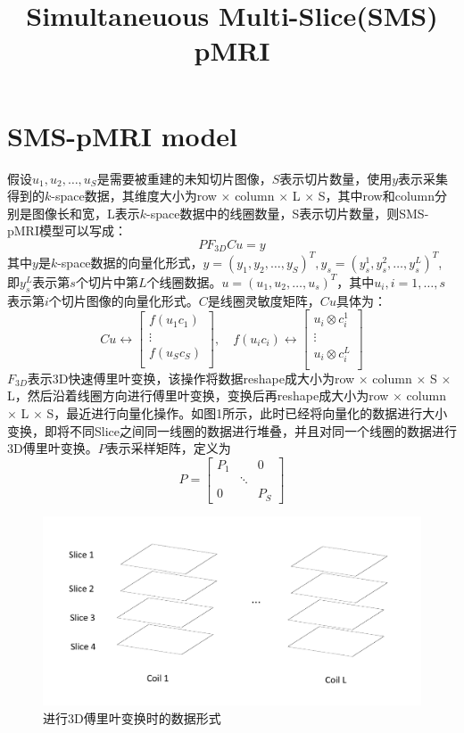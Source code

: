 \documentclass[lang=cn,11pt,a4paper,cite=numbers]{elegantpaper}
\title{Simultaneuous Multi-Slice(SMS) pMRI}
\date{\zhtoday}
\begin{document}
\maketitle

\section{SMS-pMRI model}
\par 假设$u_1, u_2,\dots, u_S$是需要被重建的未知切片图像，$S$表示切片数量，使用$y$表示采集得到的$k$-space数据，其维度大小为row $\times$ column $\times$ L $\times$ S，其中row和column分别是图像长和宽，L表示$k$-space数据中的线圈数量，S表示切片数量，则SMS-pMRI模型可以写成：
\begin{equation}
	PF_{3D}Cu = y
\end{equation}
其中$y$是$k$-space数据的向量化形式，$y=(y_1,y_2,\dots,y_S)^T,y_s=(y_s^{1},y_s^{2}, \dots,y_s^{L})^T$, 即$y_s^{L}$表示第$s$个切片中第$L$个线圈数据。$u=(u_1,u_2,\dots, u_s)^T$，其中$u_i,i=1,\dots,s$表示第$i$个切片图像的向量化形式。$C$是线圈灵敏度矩阵，$Cu$具体为：
\begin{equation}
	Cu \leftrightarrow
	\begin{bmatrix}
		f(u_1c_1) \\
		\vdots \\
		f(u_Sc_S)\\
	\end{bmatrix},
	\quad
	f(u_i c_i) \leftrightarrow
	\begin{bmatrix}
		u_i \otimes c_i^{1} \\
		\vdots \\
		u_i \otimes c_i^{L}\\
	\end{bmatrix}	
\end{equation}
$F_{3D}$表示3D快速傅里叶变换，该操作将数据reshape成大小为row $\times$ column $\times$ S $\times$ L，然后沿着线圈方向进行傅里叶变换，变换后再reshape成大小为row $\times$ column $\times$ L $\times$ S，最近进行向量化操作。如图1所示，此时已经将向量化的数据进行大小变换，即将不同Slice之间同一线圈的数据进行堆叠，并且对同一个线圈的数据进行3D傅里叶变换。$P$表示采样矩阵，定义为
\begin{equation}
	P=
	\begin{bmatrix}
		P_1 & & 0\\
		& \ddots& \\
		0& & P_S
	\end{bmatrix}
\end{equation}
\begin{figure}
	\centering
	\includegraphics[width=0.7\linewidth]{screenshot001}
	\caption{进行3D傅里叶变换时的数据形式}
	\label{fig:screenshot001}
\end{figure}
\end{document}
